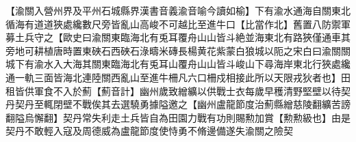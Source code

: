 【渝關入營州界及平州石城縣界漢書音義渝音喻今讀如榆】下有渝水通海自關東北循海有道道狹處纔數尺旁皆亂山高峻不可越比至進牛口【比當作北】舊置八防禦軍募土兵守之【歐史曰渝關東臨海北有兎耳覆舟山山皆斗絶並海東北有路狹僅通車其旁地可耕植唐時置東硤石西硤石淥疇米磚長楊黄花紫蒙白狼城以阨之宋白曰渝關關城下有渝水入大海其關東臨海北有兎耳山覆舟山山皆斗峻山下尋海岸東北行狹處纔通一軌三面皆海北連陸關西亂山至進牛柵凡六口柵戍相接此所以天限戎狄者也】田租皆供軍食不入於薊【薊音計】幽州歲致繒纊以供戰士衣每歲早穫清野堅壁以待契丹契丹至輒閉壁不戰俟其去選驍勇據隘邀之【幽州盧龍節度治薊縣繒慈陵翻纊苦謗翻隘烏懈翻】契丹常失利走土兵皆自為田園力戰有功則賜勲加賞【勲勲級也】由是契丹不敢輕入寇及周德威為盧龍節度使恃勇不脩邊備遂失渝關之險契